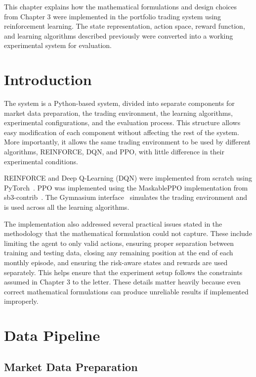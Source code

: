 This chapter explains how the mathematical formulations and design
choices from Chapter 3 were implemented in the portfolio trading system
using reinforcement learning. The state representation, action space,
reward function, and learning algorithms described previously were
converted into a working experimental system for evaluation.

\section{Introduction}

The system is a Python-based system, divided into separate components
for market data preparation, the trading environment, the learning
algorithms, experimental configurations, and the evaluation process.
This structure allows easy modification of each component without
affecting the rest of the system. More importantly, it allows the same
trading environment to be used by different algorithms, REINFORCE, DQN,
and PPO, with little difference in their experimental conditions.

REINFORCE and Deep Q-Learning (DQN) were implemented from scratch using
PyTorch~\cite{paszke2019}. PPO was implemented using the MaskablePPO implementation from
sb3-contrib~\cite{raffin2021sb3}. The Gymnasium interface~\cite{towers2024gymnasium} simulates the trading environment
and is used across all the learning algorithms.

The implementation also addressed several practical issues stated in the
methodology that the mathematical formulation could not capture. These
include limiting the agent to only valid actions, ensuring proper
separation between training and testing data, closing any remaining
position at the end of each monthly episode, and ensuring the risk-aware
states and rewards are used separately. This helps ensure that the
experiment setup follows the constraints assumed in Chapter 3 to the
letter. These details matter heavily because even correct mathematical
formulations can produce unreliable results if implemented improperly.

\section{Data Pipeline}

\subsection{Market Data Preparation}

